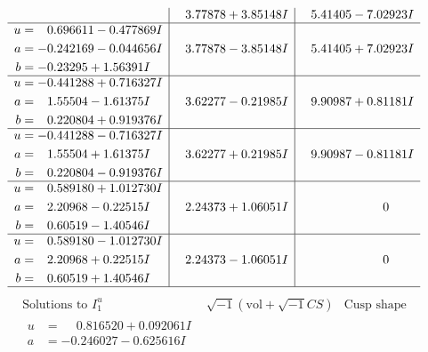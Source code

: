 \documentclass[1p]{elsarticle_modified}
\theoremstyle{definition}
\newcommand{\I}{\sqrt{-1}}
\begin{document}
$$\begin{array}{c|c|c}
 & \phantom{-}3.77878 + 3.85148 I & \phantom{-}5.41405 - 7.02923 I \\ \hline\begin{aligned}
u &= \phantom{-}0.696611 - 0.477869 I \\
a &= -0.242169 - 0.044656 I \\
b &= -0.23295 + 1.56391 I\end{aligned}
 & \phantom{-}3.77878 - 3.85148 I & \phantom{-}5.41405 + 7.02923 I \\ \hline\begin{aligned}
u &= -0.441288 + 0.716327 I \\
a &= \phantom{-}1.55504 - 1.61375 I \\
b &= \phantom{-}0.220804 + 0.919376 I\end{aligned}
 & \phantom{-}3.62277 - 0.21985 I & \phantom{-}9.90987 + 0.81181 I \\ \hline\begin{aligned}
u &= -0.441288 - 0.716327 I \\
a &= \phantom{-}1.55504 + 1.61375 I \\
b &= \phantom{-}0.220804 - 0.919376 I\end{aligned}
 & \phantom{-}3.62277 + 0.21985 I & \phantom{-}9.90987 - 0.81181 I \\ \hline\begin{aligned}
u &= \phantom{-}0.589180 + 1.012730 I \\
a &= \phantom{-}2.20968 - 0.22515 I \\
b &= \phantom{-}0.60519 - 1.40546 I\end{aligned}
 & \phantom{-}2.24373 + 1.06051 I & \phantom{-0.000000 } 0 \\ \hline\begin{aligned}
u &= \phantom{-}0.589180 - 1.012730 I \\
a &= \phantom{-}2.20968 + 0.22515 I \\
b &= \phantom{-}0.60519 + 1.40546 I\end{aligned}
 & \phantom{-}2.24373 - 1.06051 I & \phantom{-0.000000 } 0\\
 \hline 
 \end{array}$$\newpage$$\begin{array}{c|c|c}  
\text{Solutions to }I^u_{1}& \I (\text{vol} + \sqrt{-1}CS) & \text{Cusp shape}\\
 \hline 
\begin{aligned}
u &= \phantom{-}0.816520 + 0.092061 I \\
a &= -0.246027 - 0.625616 I \\

\end{aligned}
\end{array}$$
\end{document}
